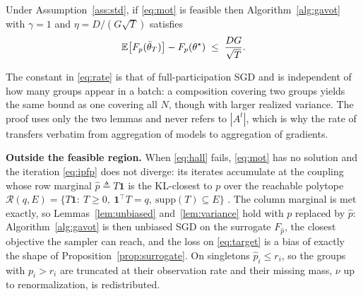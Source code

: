 \begin{theorem}[Rate]
\label{thm:rate}
Under Assumption~\ref{ass:std}, if \eqref{eq:mot} is feasible then
Algorithm~\ref{alg:gavot} with $\gamma=1$ and $\eta=D/(G\sqrt{T})$ satisfies
\begin{equation}
\mathbb{E}\big[F_p(\bar\theta_T)\big]-F_p(\theta^\star)\;\le\;\frac{DG}{\sqrt{T}} .
\label{eq:rate}
\end{equation}
\end{theorem}
The constant in \eqref{eq:rate} is that of full-participation SGD and is
independent of how many groups appear in a batch: a composition covering two
groups yields the same bound as one covering all $N$, though with larger
realized variance. The proof uses only the two lemmas and never refers to
$|A^t|$, which is why the rate of \cite{rahimi2025fedavot} transfers verbatim
from aggregation of models to aggregation of gradients.

\noindent\textbf{Outside the feasible region.}
When \eqref{eq:hall} fails, \eqref{eq:mot} has no solution and the iteration
\eqref{eq:ipfp} does not diverge: its iterates accumulate at the coupling
whose row marginal $\hat p\triangleq T\mathbf{1}$ is the KL-closest to $p$
over the reachable polytope
$\mathcal{R}(q,E)=\{T\mathbf{1}:\ T\ge 0,\ \mathbf{1}^\top T=q,\ \mathrm{supp}(T)\subseteq E\}$
\cite{csiszar1975,gietl2013ipfp,peyre2019}. The column marginal is met
exactly, so Lemmas~\ref{lem:unbiased} and~\ref{lem:variance} hold with $p$
replaced by $\hat p$: Algorithm~\ref{alg:gavot} is then unbiased SGD on the
surrogate $F_{\hat p}$, the closest objective the sampler can reach, and the
loss on \eqref{eq:target} is a bias of exactly the shape of
Proposition~\ref{prop:surrogate}. On singletons $\hat p_i\le r_i$, so the
groups with $p_i>r_i$ are truncated at their observation rate and their
missing mass, $\nu$ up to renormalization, is redistributed.


